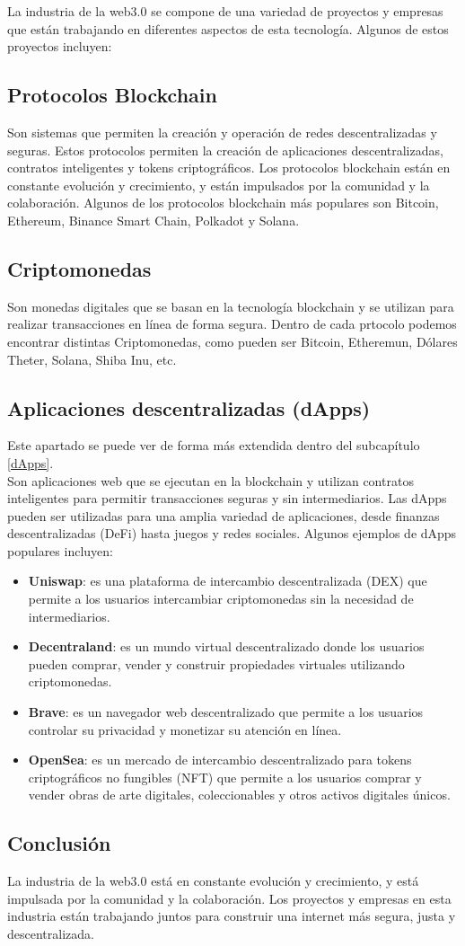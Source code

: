 La industria de la web3.0 se compone de una variedad de proyectos y empresas
que están trabajando en diferentes aspectos de esta tecnología. Algunos de
estos proyectos incluyen:

\subsection*{Protocolos Blockchain}
Son sistemas que permiten la creación y operación de redes descentralizadas y
seguras. Estos protocolos permiten la creación de aplicaciones
descentralizadas, contratos inteligentes y tokens criptográficos. Los
protocolos blockchain están en constante evolución y crecimiento, y están
impulsados por la comunidad y la colaboración. Algunos de los protocolos
blockchain más populares son Bitcoin, Ethereum, Binance Smart Chain, Polkadot y
Solana.

\subsection*{Criptomonedas}
Son monedas digitales que se basan en la tecnología blockchain y se utilizan
para realizar transacciones en línea de forma segura. Dentro de cada prtocolo
podemos encontrar distintas Criptomonedas, como pueden ser Bitcoin, Etheremun,
Dólares Theter, Solana, Shiba Inu, etc.

\subsection*{Aplicaciones descentralizadas (dApps)}
Este apartado se puede ver de forma más extendida dentro del subcapítulo
\ref{dApps}. \\ Son aplicaciones web que se ejecutan en la blockchain y
utilizan contratos inteligentes para permitir transacciones seguras y sin
intermediarios. Las dApps pueden ser utilizadas para una amplia variedad de
aplicaciones, desde finanzas descentralizadas (DeFi) hasta juegos y redes
sociales. Algunos ejemplos de dApps populares incluyen:
\begin{itemize}
    \item \textbf{Uniswap}: es una plataforma de intercambio descentralizada (DEX)
          que permite a los usuarios intercambiar criptomonedas sin la necesidad de
          intermediarios.
    \item \textbf{Decentraland}: es un mundo virtual descentralizado donde los
          usuarios pueden comprar, vender y construir propiedades virtuales utilizando
          criptomonedas.
    \item \textbf{Brave}: es un navegador web descentralizado que permite a los
          usuarios controlar su privacidad y monetizar su atención en línea.
    \item \textbf{OpenSea}: es un mercado de intercambio descentralizado para
          tokens criptográficos no fungibles (NFT) que permite a los usuarios comprar
          y vender obras de arte digitales, coleccionables y otros activos digitales
          únicos.

\end{itemize}

\subsection*{Conclusión}
La industria de la web3.0 está en constante evolución y crecimiento, y está
impulsada por la comunidad y la colaboración. Los proyectos y empresas en esta
industria están trabajando juntos para construir una internet más segura, justa
y descentralizada.